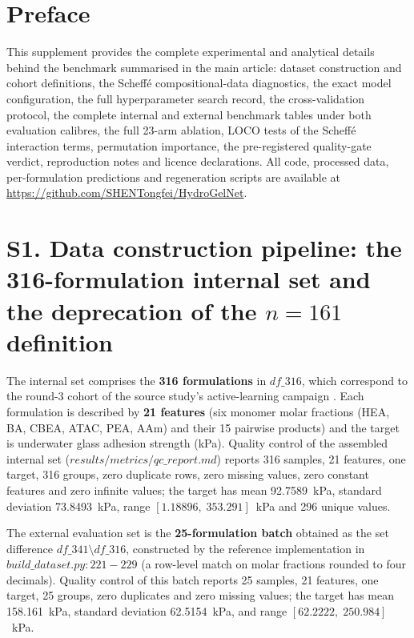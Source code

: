 \documentclass[utf8]{frontiers_suppmat}
\begin{document}
\onecolumn
{}

\title[Supplementary Material]{{}}
\maketitle

\section*{Preface}

This supplement provides the complete experimental and analytical details behind the benchmark summarised in the main article: dataset construction and cohort definitions, the Scheff\'e compositional-data diagnostics, the exact model configuration, the full hyperparameter search record, the cross-validation protocol, the complete internal and external benchmark tables under both evaluation calibres, the full 23-arm ablation, LOCO tests of the Scheff\'e interaction terms, permutation importance, the pre-registered quality-gate verdict, reproduction notes and licence declarations. All code, processed data, per-formulation predictions and regeneration scripts are available at \url{https://github.com/SHENTongfei/HydroGelNet}.

\section{S1. Data construction pipeline: the 316-formulation internal set and the deprecation of the $n = 161$ definition}

The internal set comprises the \textbf{316 formulations} in $df\_316$, which correspond to the round-3 cohort of the source study's active-learning campaign \cite{liao2025nature}. Each formulation is described by \textbf{21 features} (six monomer molar fractions (HEA, BA, CBEA, ATAC, PEA, AAm) and their 15 pairwise products) and the target is underwater glass adhesion strength (kPa). Quality control of the assembled internal set ($results/metrics/qc\_report.md$) reports 316 samples, 21 features, one target, 316 groups, zero duplicate rows, zero missing values, zero constant features and zero infinite values; the target has mean 92.7589~kPa, standard deviation 73.8493~kPa, range $[1.18896,\;353.291]$~kPa and 296 unique values.

The external evaluation set is the \textbf{25-formulation batch} obtained as the set difference $df\_341 \setminus df\_316$, constructed by the reference implementation in $build\_dataset.py{:}221{-}229$ (a row-level match on molar fractions rounded to four decimals). Quality control of this batch reports 25 samples, 21 features, one target, 25 groups, zero duplicates and zero missing values; the target has mean 158.161~kPa, standard deviation 62.5154~kPa, and range $[62.2222,\;250.984]$~kPa.
\end{document}
